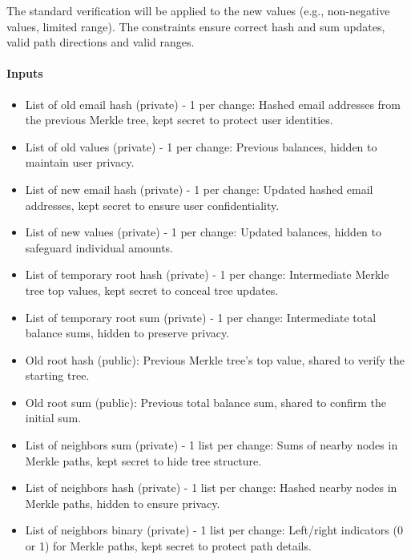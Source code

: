 The standard verification will be applied to the new values (e.g., non-negative values, limited range).
The constraints ensure correct hash and sum updates, valid path directions and valid ranges.

\paragraph{Inputs}
\begin{itemize}
   \item List of old email hash (private) - 1 per change: Hashed email addresses from the previous Merkle tree, kept secret to protect user identities.
   \item List of old values (private) - 1 per change: Previous balances, hidden to maintain user privacy.
   \item List of new email hash (private) - 1 per change: Updated hashed email addresses, kept secret to ensure user confidentiality.
   \item List of new values (private) - 1 per change: Updated balances, hidden to safeguard individual amounts.
   \item List of temporary root hash (private) - 1 per change: Intermediate Merkle tree top values, kept secret to conceal tree updates.
   \item List of temporary root sum (private) - 1 per change: Intermediate total balance sums, hidden to preserve privacy.
   \item Old root hash (public): Previous Merkle tree's top value, shared to verify the starting tree.
   \item Old root sum (public): Previous total balance sum, shared to confirm the initial sum.
   \item List of neighbors sum (private) - 1 list per change: Sums of nearby nodes in Merkle paths, kept secret to hide tree structure.
   \item List of neighbors hash (private) - 1 list per change: Hashed nearby nodes in Merkle paths, hidden to ensure privacy.
   \item List of neighbors binary (private) - 1 list per change: Left/right indicators (0 or 1) for Merkle paths, kept secret to protect path details.
\end{itemize}

